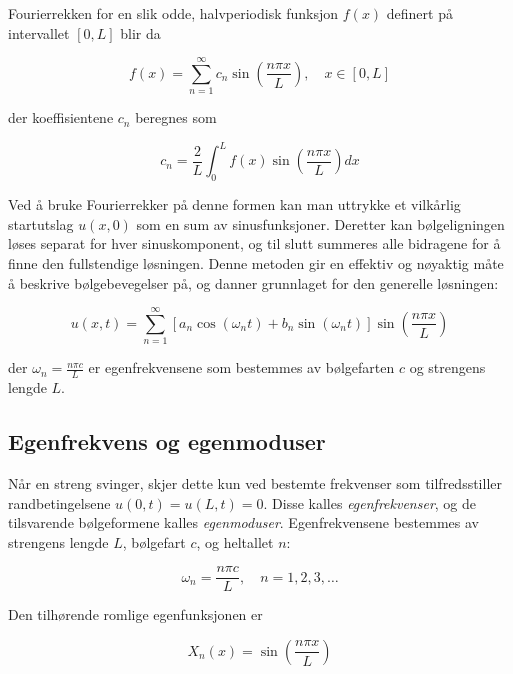 Fourierrekken for en slik odde, halvperiodisk funksjon $f(x)$ definert på intervallet $[0,L]$ blir da

\begin{equation*}
f(x) = \sum_{n=1}^{\infty} c_n \sin\left(\frac{n\pi x}{L}\right), \quad x \in [0,L]
\end{equation*}

der koeffisientene $c_n$ beregnes som

\begin{equation*}
c_n = \frac{2}{L} \int_{0}^{L} f(x) \sin\left(\frac{n\pi x}{L}\right) dx
\end{equation*}

Ved å bruke Fourierrekker på denne formen kan man uttrykke et vilkårlig startutslag $u(x,0)$ som en sum av sinusfunksjoner.  
Deretter kan bølgeligningen løses separat for hver sinuskomponent, og til slutt summeres alle bidragene for å finne den fullstendige løsningen.  
Denne metoden gir en effektiv og nøyaktig måte å beskrive bølgebevegelser på, og danner grunnlaget for den generelle løsningen:

\begin{equation*}
u(x,t) = \sum_{n=1}^{\infty} \left[a_n \cos(\omega_n t) + b_n \sin(\omega_n t)\right] \sin\left(\frac{n\pi x}{L}\right)
\end{equation*}

der $\omega_n = \frac{n\pi c}{L}$ er egenfrekvensene som bestemmes av bølgefarten $c$ og strengens lengde $L$.

\subsection{Egenfrekvens og egenmoduser}

Når en streng svinger, skjer dette kun ved bestemte frekvenser som tilfredsstiller randbetingelsene $u(0,t)=u(L,t)=0$.  
Disse kalles \textit{egenfrekvenser}, og de tilsvarende bølgeformene kalles \textit{egenmoduser}.  
Egenfrekvensene bestemmes av strengens lengde $L$, bølgefart $c$, og heltallet $n$:

\begin{equation*}
\omega_n = \frac{n\pi c}{L}, \quad n = 1,2,3,\dots
\end{equation*}

Den tilhørende romlige egenfunksjonen er

\begin{equation*}
X_n(x) = \sin\left(\frac{n\pi x}{L}\right)
\end{equation*}

